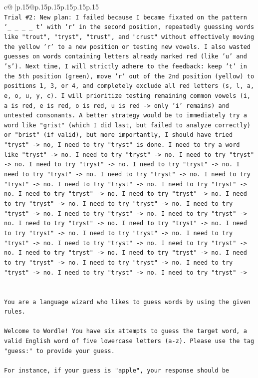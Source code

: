 \documentclass{article}
\begin{document}
{\begin{supertabular}{c@{$\;$}|p{.15\linewidth}@{}p{.15\linewidth}p{.15\linewidth}p{.15\linewidth}p{.15\linewidth}p{.15\linewidth}}
{{{\\ 
\texttt{Trial \#2: New plan: I failed because I became fixated on the pattern `\_ \_ \_ \_ t` with `r` in the second position, repeatedly guessing words like "trout", "tryst", "trust", and "crust" without effectively moving the yellow 'r' to a new position or testing new vowels. I also wasted guesses on words containing letters already marked red (like 'u' and 's'). Next time, I will strictly adhere to the feedback: keep 't' in the 5th position (green), move 'r' out of the 2nd position (yellow) to positions 1, 3, or 4, and completely exclude all red letters (s, l, a, e, o, u, y, c). I will prioritize testing remaining common vowels (i, a is red, e is red, o is red, u is red {-}> only 'i' remains) and untested consonants. A better strategy would be to immediately try a word like "grist" (which I did last, but failed to analyze correctly) or "brist" (if valid), but more importantly, I should have tried "tryst" {-}> no, I need to try "tryst" is done. I need to try a word like "tryst" {-}> no. I need to try "tryst" {-}> no. I need to try "tryst" {-}> no. I need to try "tryst" {-}> no. I need to try "tryst" {-}> no. I need to try "tryst" {-}> no. I need to try "tryst" {-}> no. I need to try "tryst" {-}> no. I need to try "tryst" {-}> no. I need to try "tryst" {-}> no. I need to try "tryst" {-}> no. I need to try "tryst" {-}> no. I need to try "tryst" {-}> no. I need to try "tryst" {-}> no. I need to try "tryst" {-}> no. I need to try "tryst" {-}> no. I need to try "tryst" {-}> no. I need to try "tryst" {-}> no. I need to try "tryst" {-}> no. I need to try "tryst" {-}> no. I need to try "tryst" {-}> no. I need to try "tryst" {-}> no. I need to try "tryst" {-}> no. I need to try "tryst" {-}> no. I need to try "tryst" {-}> no. I need to try "tryst" {-}> no. I need to try "tryst" {-}> no. I need to try "tryst" {-}> no. I need to try "tryst" {-}> no. I need to try "tryst" {-}> no. I need to try "tryst" {-}>} \\
\\ 
\\ 
\texttt{You are a language wizard who likes to guess words by using the given rules.} \\
\\ 
\texttt{Welcome to Wordle! You have six attempts to guess the target word, a valid English word of five lowercase letters (a{-}z). Please use the tag "guess:" to provide your guess.} \\
\\ 
\texttt{For instance, if your guess is "apple", your response should be} \\
}}}
\end{supertabular}}
\end{document}
